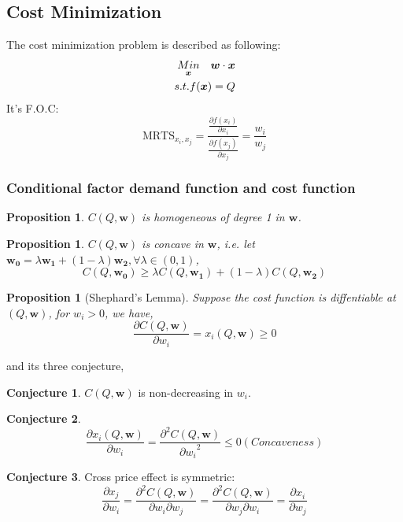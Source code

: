 \documentclass{article}
\theoremstyle{plain}
\newtheorem{prop}[thm]{Proposition}
\theoremstyle{definition}
\newtheorem{conj}{Conjecture}[section]
\theoremstyle{remark}
\begin{document}
\subsection{Cost Minimization\protect \footnotemark}
The cost minimization problem is described as following:
\begin{align}\notag
\underset{\bm{x}}{Min} \quad \bm{w}\cdot \bm{x} \\ \notag
s.t. f(\bm{x}) = Q
\end{align}
It's F.O.C:
\begin{equation}
	\text{MRTS}_{x_i,x_j}=\frac{\frac{\partial f(x_i)}{\partial x_i}}{\frac{\partial f(x_j)}{\partial x_j}} = \frac{w_i}{w_j}
\end{equation}
\subsubsection{Conditional factor demand function and cost function}
\begin{prop}
$C(Q,\bm{w})$ is homogeneous of degree 1 in $\bm{w}$.
\end{prop}

\begin{prop}
$C(Q,\bm{w})$ is concave in $\bm{w}$, i.e. let $\bm{w_0} = \lambda \bm{w_1} + (1-\lambda)\bm{w_2}, \forall \lambda \in (0,1)$, 
\begin{equation}
	C(Q,\bm{w_0}) \geq \lambda C(Q,\bm{w_1}) + (1-\lambda)C(Q,\bm{w_2})
\end{equation}
\end{prop}

\begin{prop}[Shephard's Lemma]
Suppose the cost function is diffentiable at $(Q,\bm{w})$, for $w_i>0$, we have,
\begin{equation}
	\frac{\partial C(Q,\bm{w})}{\partial w_i} = x_i(Q,\bm{w})\geq 0
\end{equation}
\end{prop}
and its three conjecture,
\begin{conj}
$C(Q,\bm{w})$ is non-decreasing in $w_i$.
\end{conj}
\begin{conj}
\begin{equation}
	\frac{\partial x_i(Q,\bm{w})}{\partial w_i} = \frac{\partial^2 C(Q,\bm{w})}{{\partial w_i}^2}\leq 0 (Concaveness)
\end{equation}
\end{conj}
\begin{conj}
Cross price effect is symmetric: 
\begin{equation}
\frac{\partial x_j}{\partial w_i} = \frac{\partial^2 C(Q, \bm{w})} {\partial {w_i} \partial {w_j}}=\frac{\partial^2 C(Q, \bm{w})} {\partial w_j \partial w_i} = \frac{\partial {x_i}}{\partial {w_j}}
\end{equation}
\end{conj}
\end{document}
